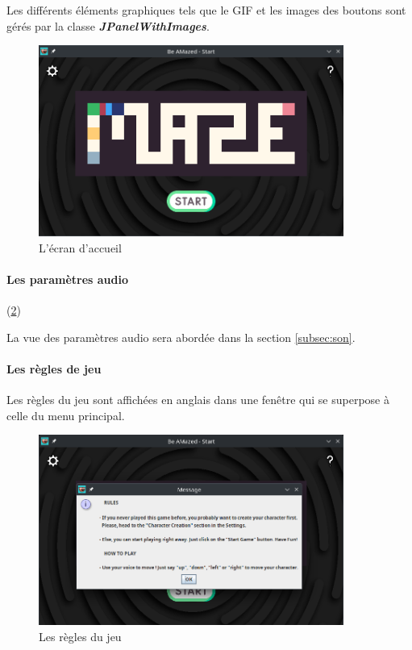 Les différents éléments graphiques tels que le GIF et les images des boutons sont gérés par la classe \textbf{\textit{JPanelWithImages}}.

\begin{figure}[h!]
    \centering
    \includegraphics[width=10cm]{ressources/Implementation/Labyrinthe/Controleur/StartMenu.png}%
    \caption{L'écran d'accueil}
    \label{fig:StartMenu}
\end{figure}
\FloatBarrier

\paragraph{Les paramètres audio} (\ref{fig:Rules})

La vue des paramètres audio sera abordée dans la section \ref{subsec:son}.

\paragraph{Les règles de jeu}

Les règles du jeu sont affichées en anglais dans une fenêtre qui se superpose à celle du menu principal.

\begin{figure}[h!]
    \centering
    \includegraphics[width=10cm]{ressources/Implementation/Labyrinthe/Controleur/Rules.png}%
    \caption{Les règles du jeu}
    \label{fig:Rules}
\end{figure}
\FloatBarrier

